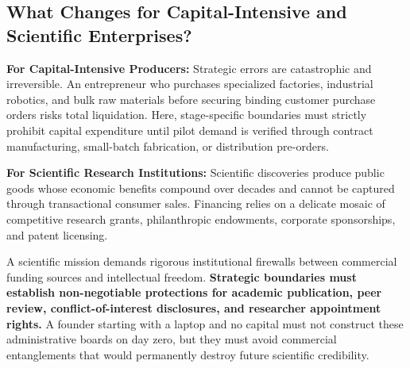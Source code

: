 \subsection{What Changes for Capital-Intensive and Scientific Enterprises?}

\textbf{For Capital-Intensive Producers:} Strategic errors are catastrophic and irreversible. An entrepreneur who purchases specialized factories, industrial robotics, and bulk raw materials before securing binding customer purchase orders risks total liquidation. Here, stage-specific boundaries must strictly prohibit capital expenditure until pilot demand is verified through contract manufacturing, small-batch fabrication, or distribution pre-orders.

\textbf{For Scientific Research Institutions:} Scientific discoveries produce public goods whose economic benefits compound over decades and cannot be captured through transactional consumer sales. Financing relies on a delicate mosaic of competitive research grants, philanthropic endowments, corporate sponsorships, and patent licensing.

A scientific mission demands rigorous institutional firewalls between commercial funding sources and intellectual freedom. \textbf{Strategic boundaries must establish non-negotiable protections for academic publication, peer review, conflict-of-interest disclosures, and researcher appointment rights.} A founder starting with a laptop and no capital must not construct these administrative boards on day zero, but they must avoid commercial entanglements that would permanently destroy future scientific credibility.
